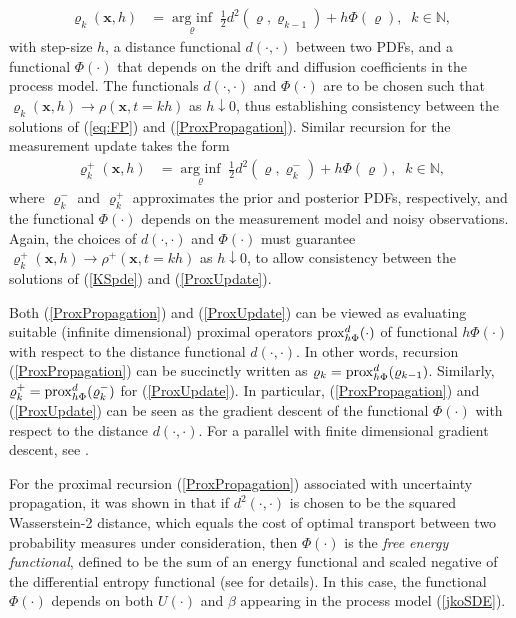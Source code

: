 \documentclass[letterpaper,10pt,twocolumn,conference]{ieeeconf}
\newcommand{\bbx}{{\bm{x}}}
\newcommand{\arginf}{\operatorname{arg\:inf}}
\begin{document}
\begin{align}
\varrho_{k}(\bbx,h)&=\underset{\varrho}{\arginf}\; \frac{1}{2}d^2(\varrho,\varrho_{k-1}) + h\Phi(\varrho), \;\; k\in\mathbb{N},
\label{ProxPropagation}\end{align}
with step-size $h$, a distance functional $d(\cdot,\cdot)$ between two PDFs, and a functional $\Phi(\cdot)$ that depends on the drift and diffusion coefficients in the process model. The functionals $d(\cdot,\cdot)$ and $\Phi(\cdot)$ are to be chosen such that $\varrho_{k}(\bbx,h) \rightarrow \rho(\bbx,t=kh)$ as $h\downarrow 0$, thus establishing consistency between the solutions of (\ref{eq:FP}) and (\ref{ProxPropagation}). Similar recursion for the measurement update takes the form
\begin{eqnarray}
\varrho_{k}^{+}(\bbx,h)&=\underset{\varrho}{\arginf}\; \frac{1}{2}d^2(\varrho,\varrho_{k}^{-}) + h\Phi(\varrho), \;\; k\in\mathbb{N},
\label{ProxUpdate}	
\end{eqnarray}
where $\varrho_{k}^{-}$ and $\varrho_{k}^{+}$ approximates the prior and posterior PDFs, respectively, and the functional $\Phi(\cdot)$ depends on the measurement model and noisy observations. Again, the choices of $d(\cdot,\cdot)$ and $\Phi(\cdot)$ must guarantee $\varrho_{k}^{+}(\bbx,h) \rightarrow \rho^{+}(\bbx,t=kh)$ as $h\downarrow 0$, to allow consistency between the solutions of (\ref{KSpde}) and (\ref{ProxUpdate}).



Both (\ref{ProxPropagation}) and (\ref{ProxUpdate}) can be viewed as evaluating suitable (infinite dimensional) proximal operators \cite{BauschkeCombettes2011, ParikhBoyd2014} ${\rm prox}_{h\Phi}^{d}(\cdot)$ of functional $h\Phi(\cdot)$ with respect to the distance functional $d(\cdot,\cdot)$. In other words, recursion (\ref{ProxPropagation}) can be succinctly written as $\varrho_{k} = {\rm prox}_{h\Phi}^{d}(\varrho_{k-1})$. Similarly, $\varrho_{k}^{+} = {\rm prox}_{h\Phi}^{d}(\varrho_{k}^{-})$ for (\ref{ProxUpdate}). In particular, (\ref{ProxPropagation}) and (\ref{ProxUpdate}) can be seen as the gradient descent of the functional $\Phi(\cdot)$ with respect to the distance $d(\cdot,\cdot)$. For a parallel with finite dimensional gradient descent, see \cite[Section I]{HalderGeorgiouCDC2017}. 



For the proximal recursion (\ref{ProxPropagation}) associated with uncertainty propagation, it was shown in \cite{JKO1998} that if $d^{2}(\cdot,\cdot)$ is chosen to be the squared Wasserstein-2 distance, which equals the cost of optimal transport between two probability measures under consideration, then $\Phi(\cdot)$ is the \emph{free energy functional}, defined to be the sum of an energy functional  and scaled negative of the differential entropy functional (see \cite[Section II]{HalderGeorgiouCDC2017} for details). In this case, the functional $\Phi(\cdot)$ depends on both $U(\cdot)$ and $\beta$ appearing in the process model (\ref{jkoSDE}).
\end{document}
